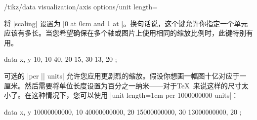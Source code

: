 \begin{key}{/tikz/data visualization/axis options/unit length=} %

    将 |scaling| 设置为 |0 at 0cm and 1 at |。换句话说，这个键允许你指定一个单元应该有多长。当您希望确保在多个轴或图片上使用相同的缩放比例时，此键特别有用。
\begin{codeexample}[preamble={\usetikzlibrary{datavisualization}}]
\tikz \datavisualization [scientific axes,
                          all axes={ticks=few, unit length=1mm},
                          visualize as line]
    data {
      x, y
      10, 10
      40, 20
      15, 30
      13, 20
    };
\end{codeexample}
    可选的  |per || units| 允许您应用更剧烈的缩放。假设你想画一幅图十亿对应于一厘米。然后需要将单位长度设置为百分之一纳米——对于\TeX\ 来说这样的尺寸太小了。在这种情况下，您可以使用 |unit length=1cm per 1000000000 units|：
\begin{codeexample}[preamble={\usetikzlibrary{datavisualization}}]
\tikz \datavisualization
  [scientific axes,
   x axis={unit length=1mm per 1000000000 units, ticks=few},
   visualize as line]
 data {
   x, y
   10000000000, 10
   40000000000, 20
   15000000000, 30
   13000000000, 20
 };
\end{codeexample}
\end{key}
%

